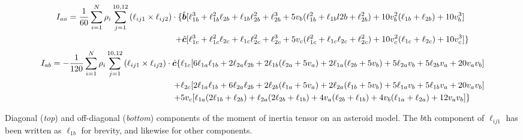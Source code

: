 \documentclass[aps,twocolumn,secnumarabic,balancelastpage,amsmath,amssymb,nofootinbib,floatfix]{revtex4-1}
\begin{document}
\begin{table*} 
    \begin{equation}
        \begin{aligned}
            I_{aa} = \frac{1}{60}\sum_{i=1}^N \rho_i \sum_{j=1}^{10, 12} \left( \ell_{ij1}\times \ell_{ij2} \right)\cdot \{&\hat{\bm b}[\ell_{1b}^3 + \ell_{1b}^2 \ell_{2b} + \ell_{1b} \ell_{2b}^2 + \ell_{2b}^3 + 
            5 v_b (\ell_{1b}^2 + \ell_{1b} l2b + \ell_{2b}^2) + 
            10 v_b^2 (\ell_{1b} + \ell_{2b}) + 10 v_b^3]\\
             + & \hat {\bm c}[\ell_{1c}^3 + \ell_{1c}^2 \ell_{2c} + \ell_{1c} \ell_{2c}^2 + \ell_{2c}^3 + 5 v_c (\ell_{1c}^2 + \ell_{1c} \ell_{2c} + \ell_{2c}^2) + 10 v_c^2(\ell_{1c} + \ell_{2c}) + 10 v_c^3]\}
        \end{aligned}
    \label{eqn:analytical-moi-same}
    \end{equation}
    \begin{equation}
        \begin{aligned}
            I_{ab} = -\frac{1}{120}\sum_{i=1}^N \rho_i \sum_{j=1}^{10, 12} \left( \ell_{ij1}\times \ell_{ij2} \right)\cdot \hat{\bm c}\{
                &\ell_{1c} [6 \ell_{1a} \ell_{1b} + 2 \ell_{2a} \ell_{2b} + 2 \ell_{1b} (\ell_{2a} + 5 v_a) + 2 \ell_{1a} (\ell_{2b} + 5 v_b) +  5 \ell_{2a} v_b + 5 \ell_{2b} v_a + 20 v_a v_b] \\
                + &\ell_{2c}[2 \ell_{1a} \ell_{1b} + 6 \ell_{2a} \ell_{2b}
                + 2 \ell_{2b}(\ell_{1a}  + 5 v_a) + 2 \ell_{2a}(\ell_{1b} + 5 v_b)
                + 5 \ell_{1a} v_b + 5 \ell_{1b}v_a + 20 v_a v_b] \\
                + &5v_c[ \ell_{1a} (2\ell_{1b} + \ell_{2b}) + \ell_{2a}(2\ell_{2b} + \ell_{1b}) + 4 v_a(\ell_{2b} + \ell_{1b}) + 4v_b(\ell_{1a} + \ell_{2a})  + 12 v_a v_b]\}
        \end{aligned}
    \label{eqn:analytical-moi-diff}
    \end{equation}
    \caption*{Diagonal (\textit{top}) and off-diagonal (\textit{bottom}) components of the moment of inertia tensor on an asteroid model. The $b$th component of $\bm \ell_{ij1}$ has been written as $\ell_{1b}$ for brevity, and likewise for other components.}
\end{table*}
\end{document}
